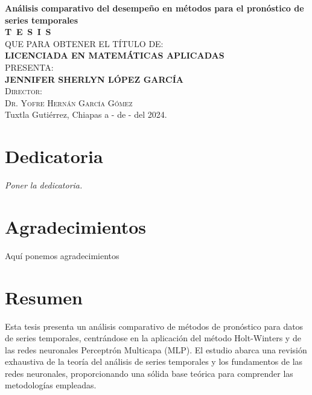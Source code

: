 \documentclass[
  us-letterpaper,
]{scrreprt}
\renewcommand*\contentsname{Tabla de contenidos}
\newcommand\contentsname{Tabla de contenidos}
\theoremstyle{definition}
\theoremstyle{plain}
\theoremstyle{plain}
\theoremstyle{definition}
\theoremstyle{remark}
\begin{document}
\begin{titlepage}
\begin{minipage}[t][0.95\textheight][c]{0.76\textwidth}
            \begin{center}
                {\Large\bfseries Análisis comparativo del desempeño en métodos para el pronóstico de series temporales}\\[2cm]
                \textsc{\huge \textbf{T\, E\, S\, I\, S}}\\[1.5cm]
                \textsc{\large QUE PARA OBTENER EL TÍTULO DE:}\\[0.3cm]
                \textbf{\textsc{LICENCIADA EN MATEMÁTICAS APLICADAS}}\\[1.5cm]
                \textsc{\large PRESENTA:}\\[0.3cm]
                \textbf{\textsc{\large {JENNIFER SHERLYN LÓPEZ GARCÍA}}}\\[2cm]
                {\large\scshape Director:\\[0.3cm]
                {\large Dr. Yofre Hernán García Gómez }}\\[2.0cm]
                \large{Tuxtla Gutiérrez, Chiapas a - de - del 2024.}

            \end{center}
\end{minipage}
\end{titlepage}

\pagebreak[2]

\chapter*{Dedicatoria}
\begin{flushright}
\textit{Poner la dedicatoria.}
\end{flushright}


\chapter*{Agradecimientos}
Aquí ponemos agradecimientos
\renewcommand*\contentsname{Tabla de contenidos}
{
\hypersetup{linkcolor=}
\setcounter{tocdepth}{2}
\tableofcontents
}

\chapter*{Resumen}\label{resumen}


Esta tesis presenta un análisis comparativo de métodos de pronóstico
para datos de series temporales, centrándose en la aplicación del método
Holt-Winters y de las redes neuronales Perceptrón Multicapa (MLP). El
estudio abarca una revisión exhaustiva de la teoría del análisis de
series temporales y los fundamentos de las redes neuronales,
proporcionando una sólida base teórica para comprender las metodologías
empleadas.
\end{document}
